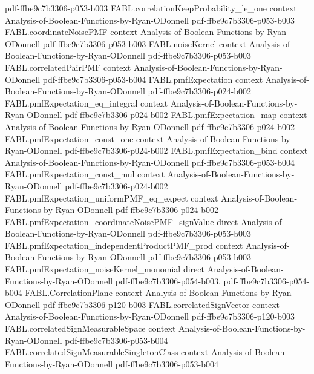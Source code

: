\begin{theorem}
  {pdf-ffbe9c7b3306-p053-b003}
\proofstep
  {FABL.correlationKeepProbability_le_one}
  {context}
  {Analysis-of-Boolean-Functions-by-Ryan-ODonnell}
  {pdf-ffbe9c7b3306-p053-b003}
\proofstep
  {FABL.coordinateNoisePMF}
  {context}
  {Analysis-of-Boolean-Functions-by-Ryan-ODonnell}
  {pdf-ffbe9c7b3306-p053-b003}
\proofstep
  {FABL.noiseKernel}
  {context}
  {Analysis-of-Boolean-Functions-by-Ryan-ODonnell}
  {pdf-ffbe9c7b3306-p053-b003}
\proofstep
  {FABL.correlatedPairPMF}
  {context}
  {Analysis-of-Boolean-Functions-by-Ryan-ODonnell}
  {pdf-ffbe9c7b3306-p053-b004}
\proofstep
  {FABL.pmfExpectation}
  {context}
  {Analysis-of-Boolean-Functions-by-Ryan-ODonnell}
  {pdf-ffbe9c7b3306-p024-b002}
\proofstep
  {FABL.pmfExpectation_eq_integral}
  {context}
  {Analysis-of-Boolean-Functions-by-Ryan-ODonnell}
  {pdf-ffbe9c7b3306-p024-b002}
\proofstep
  {FABL.pmfExpectation_map}
  {context}
  {Analysis-of-Boolean-Functions-by-Ryan-ODonnell}
  {pdf-ffbe9c7b3306-p024-b002}
\proofstep
  {FABL.pmfExpectation_const_one}
  {context}
  {Analysis-of-Boolean-Functions-by-Ryan-ODonnell}
  {pdf-ffbe9c7b3306-p024-b002}
\proofstep
  {FABL.pmfExpectation_bind}
  {context}
  {Analysis-of-Boolean-Functions-by-Ryan-ODonnell}
  {pdf-ffbe9c7b3306-p053-b004}
\proofstep
  {FABL.pmfExpectation_const_mul}
  {context}
  {Analysis-of-Boolean-Functions-by-Ryan-ODonnell}
  {pdf-ffbe9c7b3306-p024-b002}
\proofstep
  {FABL.pmfExpectation_uniformPMF_eq_expect}
  {context}
  {Analysis-of-Boolean-Functions-by-Ryan-ODonnell}
  {pdf-ffbe9c7b3306-p024-b002}
\proofstep
  {FABL.pmfExpectation_coordinateNoisePMF_signValue}
  {direct}
  {Analysis-of-Boolean-Functions-by-Ryan-ODonnell}
  {pdf-ffbe9c7b3306-p053-b003}
\proofstep
  {FABL.pmfExpectation_independentProductPMF_prod}
  {context}
  {Analysis-of-Boolean-Functions-by-Ryan-ODonnell}
  {pdf-ffbe9c7b3306-p053-b003}
\proofstep
  {FABL.pmfExpectation_noiseKernel_monomial}
  {direct}
  {Analysis-of-Boolean-Functions-by-Ryan-ODonnell}
  {pdf-ffbe9c7b3306-p054-b003,
    pdf-ffbe9c7b3306-p054-b004}
\proofstep
  {FABL.CorrelationPlane}
  {context}
  {Analysis-of-Boolean-Functions-by-Ryan-ODonnell}
  {pdf-ffbe9c7b3306-p120-b003}
\proofstep
  {FABL.correlatedSignVector}
  {context}
  {Analysis-of-Boolean-Functions-by-Ryan-ODonnell}
  {pdf-ffbe9c7b3306-p120-b003}
\proofstep
  {FABL.correlatedSignMeasurableSpace}
  {context}
  {Analysis-of-Boolean-Functions-by-Ryan-ODonnell}
  {pdf-ffbe9c7b3306-p053-b004}
\proofstep
  {FABL.correlatedSignMeasurableSingletonClass}
  {context}
  {Analysis-of-Boolean-Functions-by-Ryan-ODonnell}
  {pdf-ffbe9c7b3306-p053-b004}
\proofstep

\end{theorem}
